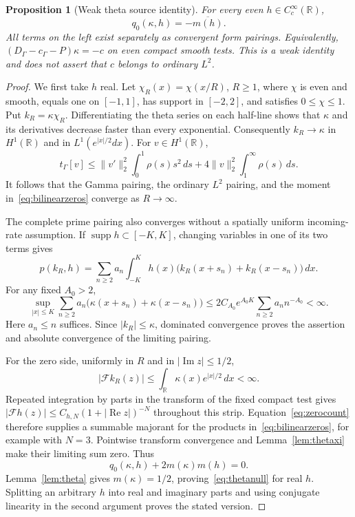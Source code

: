 \documentclass[11pt,a4paper]{article}
\numberwithin{equation}{section}
\newtheorem{proposition}[theorem]{Proposition}
\theoremstyle{remark}
\newcommand{\R}{\mathbb R}
\newcommand{\tg}{t_{\Gamma}}
\newcommand{\cg}{c_{\Gamma}}
\newcommand{\supp}{\operatorname{supp}}
\newcommand{\norm}[1]{\lVert #1\rVert}
\begin{document}
\begin{proposition}[Weak theta source identity]\label{prop:thetanull}
For every even $h\in C_c^\infty(\R)$,
\begin{equation}\label{eq:thetanull}
 q_0(\kappa,h)=-\overline{m(h)}.
\end{equation}
All terms on the left exist separately as convergent form pairings. Equivalently, $(D_\Gamma-\cg-P)\kappa=-c$ on even compact smooth tests. This is a weak identity and does not assert that $c$ belongs to ordinary $L^2$.
\end{proposition}
\begin{proof}
We first take $h$ real. Let $\chi_R(x)=\chi(x/R)$, $R\ge1$, where $\chi$ is even and smooth, equals one on $[-1,1]$, has support in $[-2,2]$, and satisfies $0\le\chi\le1$. Put $k_R=\kappa\chi_R$. Differentiating the theta series on each half-line shows that $\kappa$ and its derivatives decrease faster than every exponential. Consequently $k_R\to\kappa$ in $H^1(\R)$ and in $L^1(e^{|x|/2}dx)$. For $v\in H^1(\R)$,
\[
 \tg[v]\le\norm{v'}_2^2\int_0^1\rho(s)s^2\,ds
              +4\norm{v}_2^2\int_1^\infty\rho(s)\,ds.
\]
It follows that the Gamma pairing, the ordinary $L^2$ pairing, and the moment in~\eqref{eq:bilinearzeros} converge as $R\to\infty$.

The complete prime pairing also converges without a spatially uniform incoming-rate assumption. If $\supp h\subset[-K,K]$, changing variables in one of its two terms gives
\[
 p(k_R,h)=\sum_{n\ge2}a_n\int_{-K}^K h(x)
           \bigl(k_R(x+s_n)+k_R(x-s_n)\bigr)\,dx.
\]
For any fixed $A_0>2$,
\begin{equation}\label{eq:bridgeprimerate}
 \sup_{|x|\le K}\sum_{n\ge2}a_n
       \bigl(\kappa(x+s_n)+\kappa(x-s_n)\bigr)
 \le2C_{A_0}e^{A_0K}\sum_{n\ge2}a_nn^{-A_0}<\infty.
\end{equation}
Here $a_n\le n$ suffices. Since $|k_R|\le\kappa$, dominated convergence proves the assertion and absolute convergence of the limiting pairing.

For the zero side, uniformly in $R$ and in $|\operatorname{Im}z|\le1/2$,
\[
 |\mathcal Fk_R(z)|\le\int_\R\kappa(x)e^{|x|/2}\,dx<\infty.
\]
Repeated integration by parts in the transform of the fixed compact test gives
$|\mathcal Fh(z)|\le C_{h,N}(1+|\operatorname{Re}z|)^{-N}$ throughout this strip. Equation~\eqref{eq:zerocount} therefore supplies a summable majorant for the products in~\eqref{eq:bilinearzeros}, for example with $N=3$. Pointwise transform convergence and Lemma~\ref{lem:thetaxi} make their limiting sum zero. Thus
\[
 q_0(\kappa,h)+2m(\kappa)m(h)=0.
\]
Lemma~\ref{lem:theta} gives $m(\kappa)=1/2$, proving~\eqref{eq:thetanull} for real $h$. Splitting an arbitrary $h$ into real and imaginary parts and using conjugate linearity in the second argument proves the stated version.
\end{proof}
\end{document}
